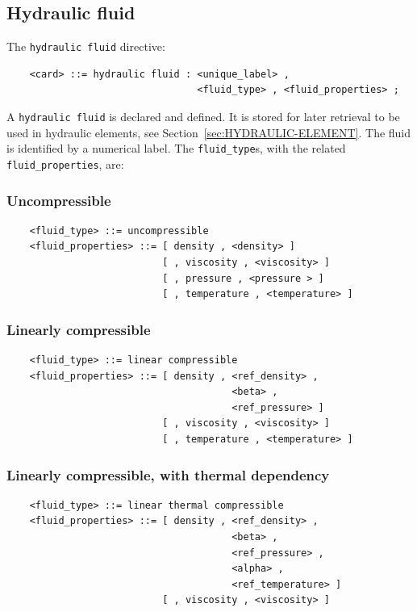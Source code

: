\documentclass[10pt,dvips]{report}
\begin{document}
\subsection{Hydraulic fluid}\label{sec:HYDRAULIC-FLUID}
The {\tt hydraulic fluid} directive:
\begin{verbatim}
    <card> ::= hydraulic fluid : <unique_label> , 
                                 <fluid_type> , <fluid_properties> ;
\end{verbatim}
A {\tt hydraulic fluid} is declared and defined.
It is stored for later retrieval to be used in hydraulic elements,
see Section~\ref{sec:HYDRAULIC-ELEMENT}.
The fluid is identified by a numerical label. 
The {\tt fluid\_type}s, with the related {\tt fluid\_properties}, are:

\subsubsection{Uncompressible}
\begin{verbatim}
    <fluid_type> ::= uncompressible
    <fluid_properties> ::= [ density , <density> ]
                           [ , viscosity , <viscosity> ]
                           [ , pressure , <pressure > ]
                           [ , temperature , <temperature> ]
\end{verbatim}

\subsubsection{Linearly compressible}
\begin{verbatim}
    <fluid_type> ::= linear compressible
    <fluid_properties> ::= [ density , <ref_density> , 
                                       <beta> , 
                                       <ref_pressure> ]
                           [ , viscosity , <viscosity> ]
                           [ , temperature , <temperature> ]
\end{verbatim}

\subsubsection{Linearly compressible, with thermal dependency}
\begin{verbatim}
    <fluid_type> ::= linear thermal compressible
    <fluid_properties> ::= [ density , <ref_density> , 
                                       <beta> , 
                                       <ref_pressure> ,
                                       <alpha> ,
                                       <ref_temperature> ]
                           [ , viscosity , <viscosity> ]
\end{verbatim}
\end{document}
